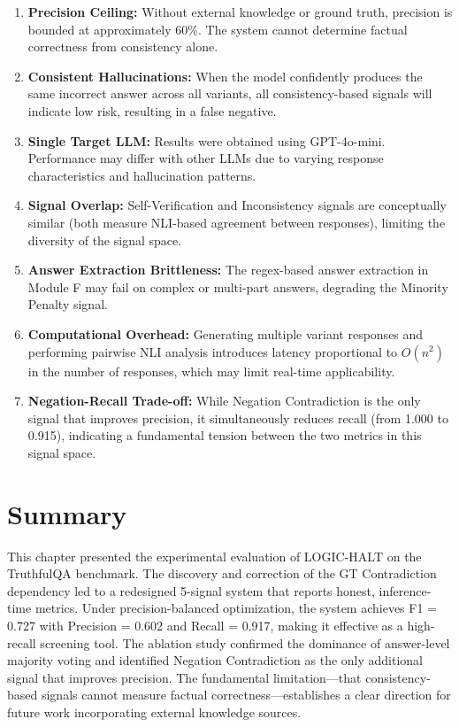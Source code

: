 \begin{enumerate}
    \item \textbf{Precision Ceiling:} Without external knowledge or ground truth, precision is bounded at approximately 60\%. The system cannot determine factual correctness from consistency alone.

    \item \textbf{Consistent Hallucinations:} When the model confidently produces the same incorrect answer across all variants, all consistency-based signals will indicate low risk, resulting in a false negative.

    \item \textbf{Single Target LLM:} Results were obtained using GPT-4o-mini. Performance may differ with other LLMs due to varying response characteristics and hallucination patterns.

    \item \textbf{Signal Overlap:} Self-Verification and Inconsistency signals are conceptually similar (both measure NLI-based agreement between responses), limiting the diversity of the signal space.

    \item \textbf{Answer Extraction Brittleness:} The regex-based answer extraction in Module F may fail on complex or multi-part answers, degrading the Minority Penalty signal.

    \item \textbf{Computational Overhead:} Generating multiple variant responses and performing pairwise NLI analysis introduces latency proportional to $O(n^2)$ in the number of responses, which may limit real-time applicability.

    \item \textbf{Negation-Recall Trade-off:} While Negation Contradiction is the only signal that improves precision, it simultaneously reduces recall (from 1.000 to 0.915), indicating a fundamental tension between the two metrics in this signal space.
\end{enumerate}

\section{Summary}

This chapter presented the experimental evaluation of LOGIC-HALT on the TruthfulQA benchmark. The discovery and correction of the GT Contradiction dependency led to a redesigned 5-signal system that reports honest, inference-time metrics. Under precision-balanced optimization, the system achieves F1 = 0.727 with Precision = 0.602 and Recall = 0.917, making it effective as a high-recall screening tool. The ablation study confirmed the dominance of answer-level majority voting and identified Negation Contradiction as the only additional signal that improves precision. The fundamental limitation---that consistency-based signals cannot measure factual correctness---establishes a clear direction for future work incorporating external knowledge sources.
